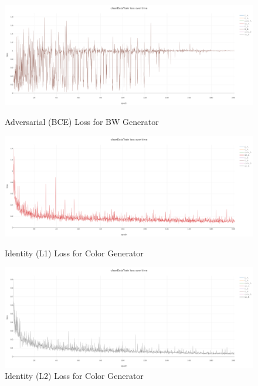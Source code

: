     \begin{figure}[htbp]
    \includegraphics[width=1\textwidth]{chapter/losses_png/g_b.png}
    \caption{ Adversarial (BCE) Loss for BW Generator}
    
    \includegraphics[width=1\textwidth]{chapter/losses_png/id_a.png}
    \caption{ Identity (L1) Loss for Color Generator}
    
    \includegraphics[width=1\textwidth]{chapter/losses_png/idt_b.png}
    \caption{ Identity (L2) Loss for Color Generator}

    \label{fig:enter-label}
\end{figure}